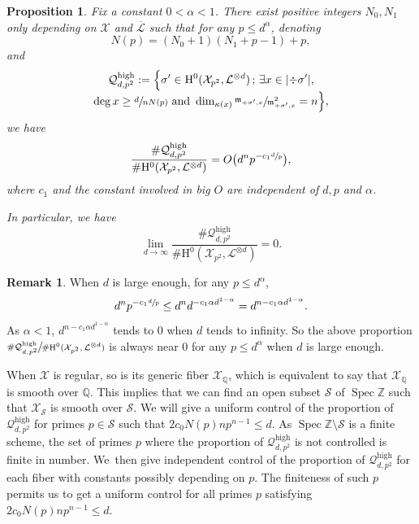 \documentclass[JEP,XML,SOM,Unicode,published]{cedram}
\newcommand{\sep}{\,;\,}
\theoremstyle{plain}
\newtheorem{prop}[thm]{Proposition}
\theoremstyle{definition}
\newtheorem*{rmq}{Remark}
\newcommand{\ho}{\mathrm{H}}
\newcommand{\m}{\mathfrak{m}}
\newcommand{\X}{\mathcal{X}}
\newcommand{\li}{\mathcal{L}}
\newcommand{\Q}{\mathbb{Q}}
\newcommand{\Z}{\mathbb{Z}}
\DeclareMathOperator{\Spec}{Spec}
\begin{document}
\label{step3}

\begin{prop}\label{high}
Fix a constant $0<\alpha<1$.
There exist positive integers $N_0,N_1$ only depending on $\X$ and $\overline{\li}$ such that for any $p\leq d^{\alpha} $, denoting
\[
N(p)= (N_0+1)(N_1+p-1)+p,
\]
and
\begin{multline*}
\mathcal{Q}^{\mathrm{high}}_{d,p^2}:=\Bigl\{ \sigma'\in \ho^0(\X_{p^2}, \li^{\otimes d})\sep \exists x\in |{\div\sigma'}|,\\[-3pt]
\deg x\geq \sfrac{d}{nN(p)} \text{ and } \dim_{\kappa(x)}\sfrac{\m_{\div \sigma',x}}{\m^2_{\div \sigma', x}}=n \Bigr\},
\end{multline*}
we have
\[
\frac{\#\mathcal{Q}_{d,p^2}^{\mathrm{high}}}{\#\ho^0(\X_{p^2}, \li^{\otimes d})}=O\bigl(d^{n}p^{-c_1\sfrac{d}{p}} \bigr),
\]
where $c_1$ and the constant involved in big $O$ are independent of $d,p$ and $\alpha$.

In particular, we have
\[
\lim_{d\to \infty}\frac{\#\mathcal{Q}_{d,p^2}^{\mathrm{high}}}{\#\ho^0(\X_{p^2}, \li^{\otimes d})}=0.
\]
\end{prop}
\begin{rmq}
When $d$ is large enough, for any $p\leq d^{\alpha}$,
\[
d^{n}p^{-c_1\sfrac{d}{p}}\leq d^{n}d^{-c_1\alpha d^{1-\alpha}}=d^{n-c_1\alpha d^{1-\alpha}}.
\]
As $\alpha<1$, $d^{n-c_1\alpha d^{1-\alpha}}$ tends to $0$ when $d$ tends to infinity. So the above proportion $\sfrac{\#\mathcal{Q}_{d,p^2}^{\mathrm{high}}}{\#\ho^0(\X_{p^2}, \li^{\otimes d})}$ is always near $0$ for any $p\leq d^{\alpha}$ when $d$ is large enough.
\end{rmq}

When $\X$ is regular, so is its generic fiber $\X_{\Q}$, which is equivalent to say that $\X_{\Q}$ is smooth over $\Q$. This implies that we can find an open subset $\mathcal{S}$ of $\Spec \Z$ such that $\X_{\mathcal{S}}$ is smooth over $\mathcal{S}$. We will give a uniform control of the proportion of $\mathcal{Q}_{d,p^2}^{\mathrm{high}}$ for primes $p\in \mathcal{S}$ such that $2c_0N(p)np^{n-1}\leq d$. As $\Spec \Z\setminus\mathcal{S}$ is a finite scheme, the set of primes $p$ where the proportion of $\mathcal{Q}_{d,p^2}^{\mathrm{high}}$ is not controlled is finite in number. We~then give independent control of the proportion of $\mathcal{Q}_{d,p^2}^{\mathrm{high}}$ for each fiber with constants possibly depending on $p$. The finiteness of such $p$ permits us to get a uniform control for all primes $p$ satisfying $2c_0N(p)np^{n-1}\leq d$.
\end{document}
